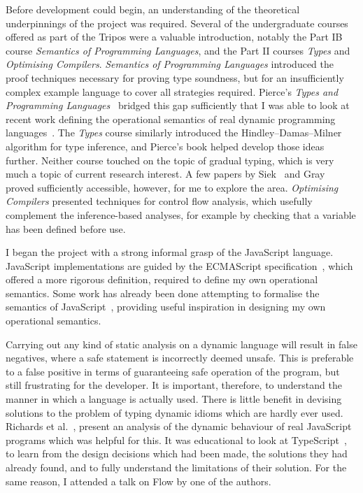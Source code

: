 \documentclass[12pt,a4paper,twoside,openright]{report}
\theoremstyle{definition}
\theoremstyle{dotless}
\begin{document}
Before development could begin, an understanding of the theoretical
underpinnings of the project was required. Several of the undergraduate courses
offered as part of the Tripos were a valuable introduction, notably the Part IB
course \textit{Semantics of Programming Languages}, and the Part II courses
\textit{Types} and \textit{Optimising Compilers}. \textit{Semantics of
  Programming Languages} introduced the proof techniques necessary for proving
type soundness, but for an insufficiently complex example language to cover all
strategies required. Pierce's \textit{Types and Programming
  Languages}~\cite{pierce} bridged this gap sufficiently that I was able to look
at recent work defining the operational semantics of real dynamic programming
languages~\cite{pythonOpSem}. The \textit{Types} course similarly introduced
the Hindley--Damas--Milner algorithm for type inference, and Pierce's book
helped develop those ideas further. Neither course touched on the topic of
gradual typing, which is very much a topic of current research interest. A few
papers by Siek~\cite{gradSiek, gradSiek2} and Gray~\cite{gradGray} proved
sufficiently accessible, however, for me to explore the area.
\textit{Optimising Compilers} presented techniques for control flow analysis,
which usefully complement the inference-based analyses, for example by checking
that a variable has been defined before use.

I began the project with a strong informal grasp of the JavaScript language.
JavaScript implementations are guided by the ECMAScript
specification~\cite{ecmaSpec}, which offered a more rigorous definition,
required to define my own operational semantics. Some work has already been
done attempting to formalise the semantics of
JavaScript~\cite{guha2010essence}, providing useful inspiration in designing my
own operational semantics. 

Carrying out any kind of static analysis on a dynamic language will result in
false negatives, where a safe statement is incorrectly deemed unsafe. This is
preferable to a false positive in terms of guaranteeing safe operation of the
program, but still frustrating for the developer. It is important,
therefore, to understand the manner in which a language is actually used. There
is little benefit in devising solutions to the problem of typing dynamic idioms
which are hardly ever used. Richards et al.~\cite{JSBehaviour}, present an analysis of the dynamic
behaviour of real JavaScript programs which was helpful for this. It
was educational to look at TypeScript~\cite{ts,understandingTS}, to learn from
the design decisions which had been made, the solutions they had already found,
and to fully understand the limitations of their solution. For the same reason, I attended a
talk on Flow by one of the authors.
\end{document}
